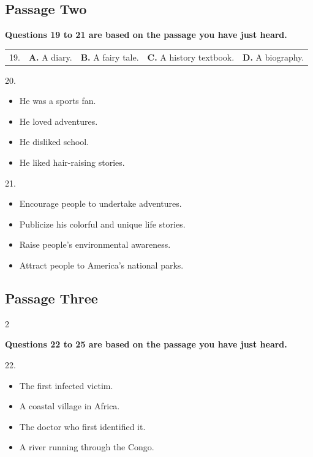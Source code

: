 \documentclass[UTF8,11pt]{ctexart}
\begin{document}
\subsection*{\textbf{Passage Two}}


\textbf{Questions 19 to 21 are based on the passage you have just heard.}


\noindent\begin{tabularx}{\linewidth}{@{}lXXXX@{}}19. & \textbf{A.} A diary. & \textbf{B.} A fairy tale. & \textbf{C.} A history textbook. & \textbf{D.} A biography.\\\end{tabularx}\par

20.


\begin{itemize}[leftmargin=2em,itemsep=.2em,topsep=.4em]\item[A.] He was a sports fan.
\item[B.] He loved adventures.
\item[C.] He disliked school.
\item[D.] He liked hair-raising stories.
\end{itemize}

21.


\begin{itemize}[leftmargin=2em,itemsep=.2em,topsep=.4em]\item[A.] Encourage people to undertake adventures.
\item[B.] Publicize his colorful and unique life stories.
\item[C.] Raise people’s environmental awareness.
\item[D.] Attract people to America’s national parks.
\end{itemize}

\subsection*{\textbf{Passage Three}}


2


\textbf{Questions 22 to 25 are based on the passage you have just heard.}


22.


\begin{itemize}[leftmargin=2em,itemsep=.2em,topsep=.4em]\item[A.] The first infected victim.
\item[B.] A coastal village in Africa.
\item[C.] The doctor who first identified it.
\item[D.] A river running through the Congo.
\end{itemize}
\end{document}
